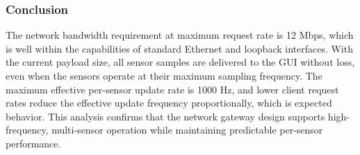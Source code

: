 \documentclass{article}
\begin{document}
\subsubsection{Conclusion}

The network bandwidth requirement at maximum request rate is 12 Mbps, which is well 
within the capabilities of standard Ethernet and loopback interfaces. With the current 
payload size, all sensor samples are delivered to the GUI without loss, even when the 
sensors operate at their maximum sampling frequency. The maximum effective per-sensor 
update rate is 1000 Hz, and lower client request rates reduce the effective update 
frequency proportionally, which is expected behavior. This analysis confirms that the 
network gateway design supports high-frequency, multi-sensor operation while 
maintaining predictable per-sensor performance.
\end{document}
